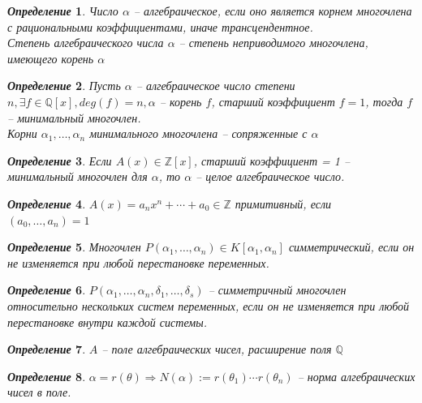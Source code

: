 \documentclass[a4paper,12pt]{article}
\newtheorem{deff2}{\textit{Определение}}
\newcommand{\TE}{\theta}
\newcommand{\AL}{\alpha}
\newcommand{\Ra}{\Rightarrow}
\newcommand{\bb}[1]{\mathbb{#1}}
\begin{document}
\begin{formbox}{}
\begin{deff2} Число $\AL$ -- алгебраическое, если оно является корнем многочлена с рациональными коэффициентами, иначе трансцендентное.\\
Степень алгебраического числа $\AL$ -- степень неприводимого многочлена, имеющего корень $\AL$
\end{deff2}
\end{formbox}
\begin{formbox}{}
\begin{deff2} Пусть $\AL$ -- алгебраическое число степени $n, \exists f\in\bb{Q}[x], deg(f) = n, \AL$ -- корень $f$, старший коэффициент $f = 1$, тогда $f$ -- минимальный многочлен.\\
Корни $\AL_1,\dots,\AL_n$ минимального многочлена -- сопряженные с $\AL$ 
\end{deff2}
\end{formbox}
\begin{formbox}{}
\begin{deff2} Если $A(x)\in\bb{Z}[x]$, старший коэффициент = 1 -- минимальный многочлен для $\AL$, то $\AL$ -- целое алгебраическое число.
\end{deff2}
\end{formbox}
\begin{formbox}{}
\begin{deff2} $A(x) = a_nx^n + \cdots + a_0\in\bb{Z}$ примитивный, если $(a_0,\dots,a_n) = 1$
\end{deff2}
\end{formbox}
\begin{formbox}{}
\begin{deff2} Многочлен $P(\AL_1,\dots,\AL_n) \in K[\AL_1, \AL_n]$ симметрический, если он не изменяется при любой перестановке переменных.
\end{deff2}
\end{formbox}
\begin{formbox}{}
\begin{deff2} $P(\AL_1, \dots, \AL_n, \delta_1,\dots,\delta_s)$ -- симметричный многочлен относительно нескольких систем переменных, если он не изменяется при любой перестановке внутри каждой системы.
\end{deff2}
\end{formbox}
\begin{formbox}{}
\begin{deff2} $A$ -- поле алгебраических чисел, расширение поля $\bb{Q}$
\end{deff2}
\end{formbox}
\begin{formbox}{}
\begin{deff2} $\AL = r(\TE)\Ra N(\AL) := r(\TE_1)\cdots r(\TE_n)$ -- норма алгебраических чисел в поле.
\end{deff2}
\end{formbox}
\end{document}
